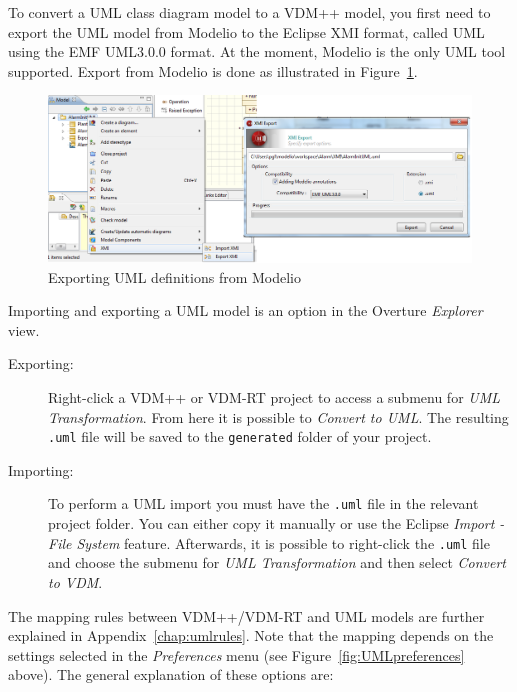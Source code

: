\documentclass{overturerepchap}
\begin{document}
To convert a UML class diagram model to a VDM++ model, you first need to export
the UML model from Modelio to the Eclipse XMI format, called UML
using the EMF UML3.0.0 format. At the moment, Modelio is the only
UML tool supported. Export from Modelio is done as illustrated in
Figure~\ref{fig:exportfromUML}.

\begin{figure}[htbp]
\begin{center}
\includegraphics[width=4.5in]{screenDumps/xmiexportmodelio}
\caption{Exporting UML definitions from Modelio\label{fig:exportfromUML}}
\end{center}
\end{figure}

Importing and exporting a UML model is
an option in the Overture \emph{Explorer} view.
\begin{description}
    \item[Exporting:] Right-click a VDM++ or VDM-RT project to access a submenu
        for \emph{UML Transformation}. From here it is possible to
        \emph{Convert to UML}. The resulting \texttt{.uml} 
        file will be saved to the \texttt{generated} folder of your project.
    
    \item[Importing:] To perform a UML import you must have the \texttt{.uml} 
        file in the relevant project folder. You can either copy it manually or
        use the Eclipse \emph{Import - File System} feature. Afterwards, it
        is possible to right-click the \texttt{.uml} file and choose the
        submenu for \emph{UML Transformation} and
        then select \emph{Convert to VDM}. 

\end{description}

The mapping rules between VDM++/VDM-RT and UML models are further explained 
in Appendix~\ref{chap:umlrules}. Note that the mapping depends on the settings
selected in the \emph{Preferences} menu (see Figure~\ref{fig:UMLpreferences} 
above). The general explanation of these options are:
\end{document}
